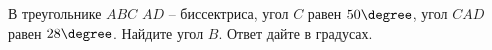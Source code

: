 \begin{ex}
	\begin{condition}
		В треугольнике \( ABC \) \( AD \) – биссектриса, угол \( C \) равен \( 50\degree \), угол \( CAD \) равен \( 28\degree \). Найдите угол \( B \). Ответ дайте в градусах.
	\end{condition}
\end{ex}